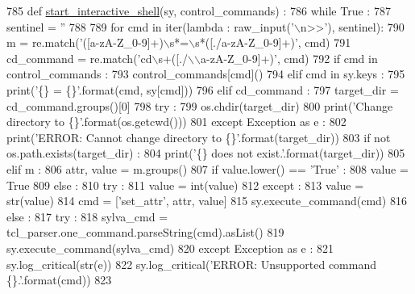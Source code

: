 \begin{DoxyCode}
785 \textcolor{keyword}{def }\hyperlink{namespacesylva_1_1misc_1_1exec_a75779a3eb47b91a0f69020b264c0bd2d}{start\_interactive\_shell}(sy, control\_commands) :
786   \textcolor{keywordflow}{while} \textcolor{keyword}{True} :
787     sentinel = \textcolor{stringliteral}{''}
788 
789     \textcolor{keywordflow}{for} cmd \textcolor{keywordflow}{in} iter(\textcolor{keyword}{lambda} : raw\_input(\textcolor{stringliteral}{'\(\backslash\)n>>'}), sentinel):
790       m = re.match(\textcolor{stringliteral}{'([a-zA-Z\_0-9]+)\(\backslash\)s*=\(\backslash\)s*([./a-zA-Z\_0-9]+)'}, cmd)
791       cd\_command = re.match(\textcolor{stringliteral}{'cd\(\backslash\)s+([./\(\backslash\)\(\backslash\)a-zA-Z\_0-9]+)'}, cmd)
792       \textcolor{keywordflow}{if} cmd \textcolor{keywordflow}{in} control\_commands :
793         control\_commands[cmd]()
794       \textcolor{keywordflow}{elif} cmd \textcolor{keywordflow}{in} sy.keys :
795         print(\textcolor{stringliteral}{'\{\} = \{\}'}.format(cmd, sy[cmd]))
796       \textcolor{keywordflow}{elif} cd\_command :
797         target\_dir = cd\_command.groups()[0]
798         \textcolor{keywordflow}{try} :
799           os.chdir(target\_dir)
800           print(\textcolor{stringliteral}{'Change directory to \{\}'}.format(os.getcwd()))
801         \textcolor{keywordflow}{except} Exception \textcolor{keyword}{as} e :
802           print(\textcolor{stringliteral}{'ERROR: Cannot change directory to \{\}'}.format(target\_dir))
803           \textcolor{keywordflow}{if} \textcolor{keywordflow}{not} os.path.exists(target\_dir) :
804             print(\textcolor{stringliteral}{'\{\} does not exist.'}.format(target\_dir))
805       \textcolor{keywordflow}{elif} m :
806         attr, value = m.groups()
807         \textcolor{keywordflow}{if} value.lower() == \textcolor{stringliteral}{'True'} :
808           value = \textcolor{keyword}{True}
809         \textcolor{keywordflow}{else} :
810           \textcolor{keywordflow}{try} :
811             value = int(value)
812           \textcolor{keywordflow}{except} :
813             value = str(value)
814         cmd = [\textcolor{stringliteral}{'set\_attr'}, attr, value]
815         sy.execute\_command(cmd)
816       \textcolor{keywordflow}{else} :
817         \textcolor{keywordflow}{try} :
818           sylva\_cmd = tcl\_parser.one\_command.parseString(cmd).asList()
819           sy.execute\_command(sylva\_cmd)
820         \textcolor{keywordflow}{except} Exception \textcolor{keyword}{as} e :
821           sy.log\_critical(str(e))
822           sy.log\_critical(\textcolor{stringliteral}{'ERROR: Unsupported command \{\}.'}.format(cmd))
823 
\end{DoxyCode}


